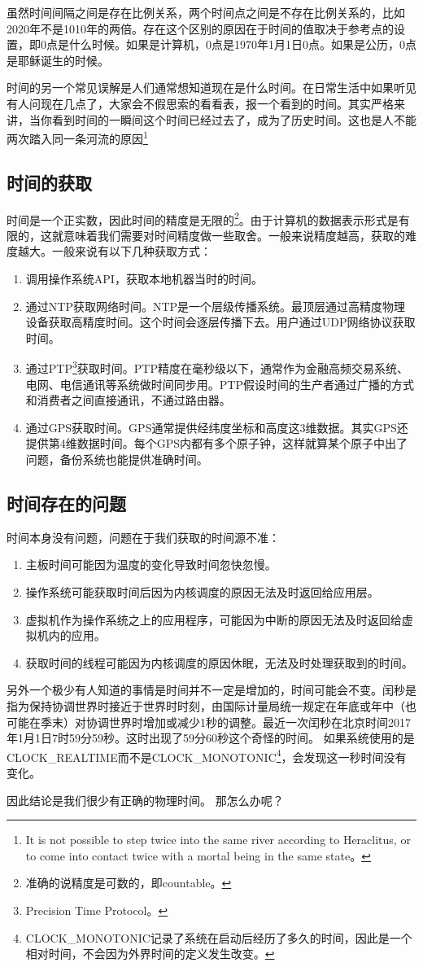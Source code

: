虽然时间间隔之间是存在比例关系，两个时间点之间是不存在比例关系的，比如2020年不是1010年的两倍。存在这个区别的原因在于时间的值取决于参考点的设置，即0点是什么时候。如果是计算机，0点是1970年1月1日0点。如果是公历，0点是耶稣诞生的时候。

时间的另一个常见误解是人们通常想知道现在是什么时间。在日常生活中如果听见有人问现在几点了，大家会不假思索的看看表，报一个看到的时间。其实严格来讲，当你看到时间的一瞬间这个时间已经过去了，成为了历史时间。这也是人不能两次踏入同一条河流的原因\footnote{It is not possible to step twice into the same river according to Heraclitus, or to come into contact twice with a mortal being in the same state。}


\subsection{时间的获取}

时间是一个正实数，因此时间的精度是无限的\footnote{准确的说精度是可数的，即countable。}。由于计算机的数据表示形式是有限的，这就意味着我们需要对时间精度做一些取舍\label{timeaccuracy}。一般来说精度越高，获取的难度越大。一般来说有以下几种获取方式：
\begin{enumerate}
    \item 调用操作系统API，获取本地机器当时的时间。
    \item 通过NTP获取网络时间。NTP是一个层级传播系统。最顶层通过高精度物理设备获取高精度时间。这个时间会逐层传播下去。用户通过UDP网络协议获取时间。
    \item 通过PTP\footnote{Precision Time Protocol。}获取时间。PTP精度在毫秒级以下，通常作为金融高频交易系统、电网、电信通讯等系统做时间同步用。PTP假设时间的生产者通过广播的方式和消费者之间直接通讯，不通过路由器。
    \item 通过GPS获取时间。GPS通常提供经纬度坐标和高度这3维数据。其实GPS还提供第4维数据时间。每个GPS内都有多个原子钟，这样就算某个原子中出了问题，备份系统也能提供准确时间。
\end{enumerate}


\subsection{时间存在的问题}

时间本身没有问题，问题在于我们获取的时间源不准：
\begin{enumerate}
    \item 主板时间可能因为温度的变化导致时间忽快忽慢。
    \item 操作系统可能获取时间后因为内核调度的原因无法及时返回给应用层。
    \item 虚拟机作为操作系统之上的应用程序，可能因为中断的原因无法及时返回给虚拟机内的应用。
    \item 获取时间的线程可能因为内核调度的原因休眠，无法及时处理获取到的时间。
\end{enumerate}

另外一个极少有人知道的事情是时间并不一定是增加的，时间可能会不变。闰秒是指为保持协调世界时接近于世界时时刻，由国际计量局统一规定在年底或年中（也可能在季末）对协调世界时增加或减少1秒的调整。最近一次闰秒在北京时间2017年1月1日7时59分59秒。这时出现了59分60秒这个奇怪的时间。 如果系统使用的是CLOCK\_REALTIME而不是CLOCK\_MONOTONIC\footnote{CLOCK\_MONOTONIC记录了系统在启动后经历了多久的时间，因此是一个相对时间，不会因为外界时间的定义发生改变。}，会发现这一秒时间没有变化。

因此结论是我们很少有正确的物理时间。 那怎么办呢？
